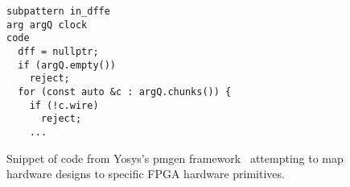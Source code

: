 

\begin{figure}[H]
    \centering
\begin{verbatim}
subpattern in_dffe
arg argQ clock
code
  dff = nullptr;
  if (argQ.empty())
    reject;
  for (const auto &c : argQ.chunks()) {
    if (!c.wire)
      reject;
    ...
\end{verbatim}
    \caption{
Snippet of code
  from Yosys's pmgen framework~\cite{yosysxilinxpmgen}
  attempting to map hardware designs
  to specific FPGA hardware primitives.
    }
    \label{fig:intro:yosys-pmgen}
\end{figure}

